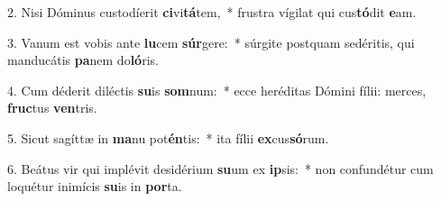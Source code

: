 2. Nisi Dóminus custodíerit \textbf{ci}vi\textbf{tá}tem,~*  frustra vígilat qui cus\textbf{tó}dit \textbf{e}am.\

3. Vanum est vobis ante \textbf{lu}cem \textbf{súr}gere:~*  súrgite postquam sedéritis, qui manducátis \textbf{pa}nem do\textbf{ló}ris.\

4. Cum déderit diléctis \textbf{su}is \textbf{som}num:~*  ecce heréditas Dómini fílii: merces, \textbf{fruc}tus \textbf{ven}tris.\

5. Sicut sagíttæ in \textbf{ma}nu pot\textbf{én}tis:~*  ita fílii \textbf{ex}cus\textbf{só}rum.\

6. Beátus vir qui implévit desidérium \textbf{su}um ex \textbf{ip}sis:~*  non confundétur cum loquétur inimícis \textbf{su}is in \textbf{por}ta.\

